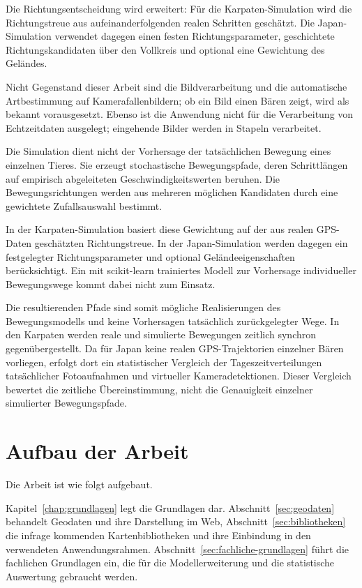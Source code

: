 \documentclass[12pt,a4paper]{report}
\begin{document}
Die Richtungsentscheidung wird erweitert:
Für die Karpaten-Simulation wird die
Richtungstreue aus aufeinanderfolgenden
realen Schritten geschätzt. Die Japan-Simulation
verwendet dagegen einen festen Richtungsparameter,
geschichtete Richtungskandidaten über den
Vollkreis und optional eine Gewichtung
des Geländes.


Nicht Gegenstand dieser Arbeit sind die
Bildverarbeitung und die automatische
Artbestimmung auf Kamerafallenbildern;
ob ein Bild einen Bären zeigt, wird als
bekannt vorausgesetzt. Ebenso ist die
Anwendung nicht für die Verarbeitung
von Echtzeitdaten ausgelegt; eingehende
Bilder werden in Stapeln verarbeitet.

Die Simulation dient nicht der Vorhersage
der tatsächlichen Bewegung eines einzelnen
Tieres. Sie erzeugt stochastische
Bewegungspfade, deren Schrittlängen auf
empirisch abgeleiteten Geschwindigkeitswerten
beruhen. Die Bewegungsrichtungen werden aus
mehreren möglichen Kandidaten durch eine
gewichtete Zufallsauswahl bestimmt.

In der Karpaten-Simulation basiert diese
Gewichtung auf der aus realen GPS-Daten
geschätzten Richtungstreue. In der
Japan-Simulation werden dagegen ein
festgelegter Richtungsparameter und
optional Geländeeigenschaften berücksichtigt.
Ein mit scikit-learn trainiertes Modell
zur Vorhersage individueller Bewegungswege
kommt dabei nicht zum Einsatz.

Die resultierenden Pfade sind somit
mögliche Realisierungen des Bewegungsmodells
und keine Vorhersagen tatsächlich
zurückgelegter Wege. In den Karpaten werden
reale und simulierte Bewegungen zeitlich
synchron gegenübergestellt. Da für Japan
keine realen GPS-Trajektorien einzelner
Bären vorliegen, erfolgt dort ein
statistischer Vergleich der
Tageszeitverteilungen tatsächlicher
Fotoaufnahmen und virtueller
Kameradetektionen. Dieser Vergleich
bewertet die zeitliche Übereinstimmung,
nicht die Genauigkeit einzelner
simulierter Bewegungspfade.



\section{Aufbau der Arbeit}
\label{sec:aufbau}

Die Arbeit ist wie folgt aufgebaut.

Kapitel~\ref{chap:grundlagen} legt die Grundlagen dar. Abschnitt~\ref{sec:geodaten}
behandelt Geodaten und ihre Darstellung im Web, Abschnitt~\ref{sec:bibliotheken} die
infrage kommenden Kartenbibliotheken und ihre Einbindung in den verwendeten
Anwendungsrahmen. Abschnitt~\ref{sec:fachliche-grundlagen} führt die fachlichen Grundlagen
ein, die für die Modellerweiterung und die statistische Auswertung gebraucht werden.
\end{document}
